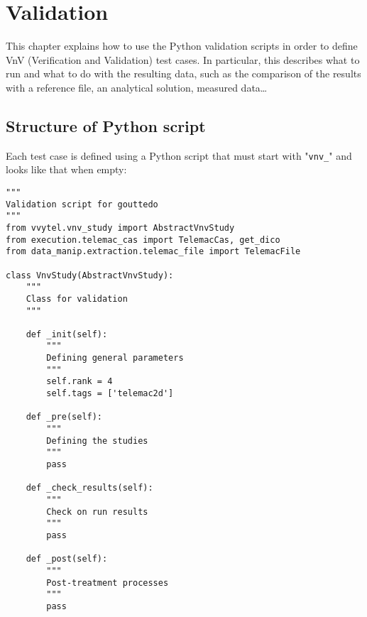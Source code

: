 \chapter{Validation}

This chapter explains how to use the Python validation scripts in order to
define VnV (Verification and Validation) test cases.
In particular, this describes what to run and what to do with the resulting
data, such as the comparison of the results with a reference file, an
analytical solution, measured data\ldots

\section{Structure of Python script}
\label{ref:descVnvStudy}

Each test case is defined using a Python script that must start with
"\verb!vnv_!" and looks like that when empty:


\begin{lstlisting}
"""
Validation script for gouttedo
"""
from vvytel.vnv_study import AbstractVnvStudy
from execution.telemac_cas import TelemacCas, get_dico
from data_manip.extraction.telemac_file import TelemacFile

class VnvStudy(AbstractVnvStudy):
    """
    Class for validation
    """

    def _init(self):
        """
        Defining general parameters
        """
        self.rank = 4
        self.tags = ['telemac2d']

    def _pre(self):
        """
        Defining the studies
        """
        pass

    def _check_results(self):
        """
        Check on run results
        """
        pass

    def _post(self):
        """
        Post-treatment processes
        """
        pass
\end{lstlisting}

